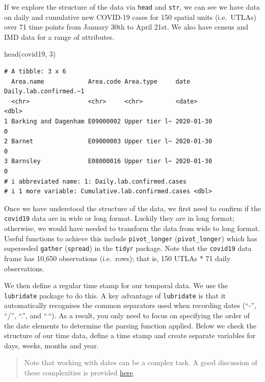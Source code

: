 \documentclass[
  letterpaper,
  DIV=11,
  numbers=noendperiod,
  oneside]{scrreprt}
\newenvironment{Shaded}{\begin{snugshade}}{\end{snugshade}}
\newcommand{\DecValTok}[1]{\textcolor[rgb]{0.68,0.00,0.00}{#1}}
\newcommand{\FunctionTok}[1]{\textcolor[rgb]{0.28,0.35,0.67}{#1}}
\newcommand{\NormalTok}[1]{\textcolor[rgb]{0.00,0.23,0.31}{#1}}
\begin{document}
If we explore the structure of the data via \texttt{head} and
\texttt{str}, we can see we have data on daily and cumulative new
COVID-19 cases for 150 spatial units (i.e.~UTLAs) over 71 time points
from January 30th to April 21st. We also have census and IMD data for a
range of attributes.

\begin{Shaded}
\begin{Highlighting}[]
\FunctionTok{head}\NormalTok{(covid19, }\DecValTok{3}\NormalTok{)}
\end{Highlighting}
\end{Shaded}

\begin{verbatim}
# A tibble: 3 x 6
  Area.name            Area.code Area.type     date       Daily.lab.confirmed.~1
  <chr>                <chr>     <chr>         <date>                      <dbl>
1 Barking and Dagenham E09000002 Upper tier l~ 2020-01-30                      0
2 Barnet               E09000003 Upper tier l~ 2020-01-30                      0
3 Barnsley             E08000016 Upper tier l~ 2020-01-30                      0
# i abbreviated name: 1: Daily.lab.confirmed.cases
# i 1 more variable: Cumulative.lab.confirmed.cases <dbl>
\end{verbatim}

Once we have understood the structure of the data, we first need to
confirm if the \texttt{covid19} data are in wide or long format. Luckily
they are in long format; otherwise, we would have needed to transform
the data from wide to long format. Useful functions to achieve this
include \texttt{pivot\_longer} (\texttt{pivot\_longer}) which has
superseded \texttt{gather} (\texttt{spread}) in the \texttt{tidyr}
package. Note that the \texttt{covid19} data frame has 10,650
observations (i.e.~rows); that is, 150 UTLAs * 71 daily observations.

We then define a regular time stamp for our temporal data. We use the
\texttt{lubridate} package to do this. A key advantage of
\texttt{lubridate} is that it automatically recognises the common
separators used when recording dates (``-'', ``/'', ``.'', and ``\,``).
As a result, you only need to focus on specifying the order of the date
elements to determine the parsing function applied. Below we check the
structure of our time data, define a time stamp and create separate
variables for days, weeks, months and year.

\begin{quote}
Note that working with dates can be a complex task. A good discussion of
these complexities is provided
\href{http://uc-r.github.io/dates/\#convert_date}{here}.
\end{quote}
\end{document}
